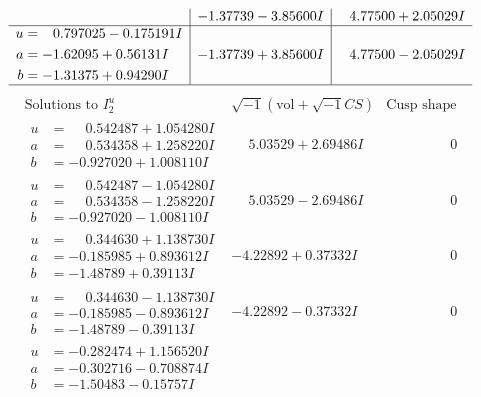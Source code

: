 \documentclass[1p]{elsarticle_modified}
\theoremstyle{definition}
\newcommand{\I}{\sqrt{-1}}
\begin{document}
$$\begin{array}{c|c|c}
 & -1.37739 - 3.85600 I & \phantom{-}4.77500 + 2.05029 I \\ \hline\begin{aligned}
u &= \phantom{-}0.797025 - 0.175191 I \\
a &= -1.62095 + 0.56131 I \\
b &= -1.31375 + 0.94290 I\end{aligned}
 & -1.37739 + 3.85600 I & \phantom{-}4.77500 - 2.05029 I\\
 \hline 
 \end{array}$$\newpage$$\begin{array}{c|c|c}  
\text{Solutions to }I^u_{2}& \I (\text{vol} + \sqrt{-1}CS) & \text{Cusp shape}\\
 \hline 
\begin{aligned}
u &= \phantom{-}0.542487 + 1.054280 I \\
a &= \phantom{-}0.534358 + 1.258220 I \\
b &= -0.927020 + 1.008110 I\end{aligned}
 & \phantom{-}5.03529 + 2.69486 I & \phantom{-0.000000 } 0 \\ \hline\begin{aligned}
u &= \phantom{-}0.542487 - 1.054280 I \\
a &= \phantom{-}0.534358 - 1.258220 I \\
b &= -0.927020 - 1.008110 I\end{aligned}
 & \phantom{-}5.03529 - 2.69486 I & \phantom{-0.000000 } 0 \\ \hline\begin{aligned}
u &= \phantom{-}0.344630 + 1.138730 I \\
a &= -0.185985 + 0.893612 I \\
b &= -1.48789 + 0.39113 I\end{aligned}
 & -4.22892 + 0.37332 I & \phantom{-0.000000 } 0 \\ \hline\begin{aligned}
u &= \phantom{-}0.344630 - 1.138730 I \\
a &= -0.185985 - 0.893612 I \\
b &= -1.48789 - 0.39113 I\end{aligned}
 & -4.22892 - 0.37332 I & \phantom{-0.000000 } 0 \\ \hline\begin{aligned}
u &= -0.282474 + 1.156520 I \\
a &= -0.302716 - 0.708874 I \\
b &= -1.50483 - 0.15757 I\end{aligned}

\end{array}$$
\end{document}
